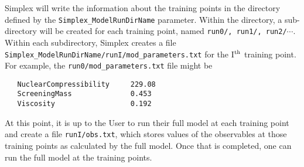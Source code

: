 \documentclass[UserManual.tex]{subfiles}
\begin{document}
Simplex will write the information about the training points in the directory defined by the {\tt Simplex\_ModelRunDirName} parameter. Within the directory, a sub-directory will be created for each training point, named {\tt run0/, run1/, run2/}$\cdots$. Within each subdirectory, Simplex creates a file {\tt Simplex\_ModelRunDirName/runI/mod\_parameters.txt} for the I$^{\rm th}$ training point. For example, the {\tt run0/mod\_parameters.txt} file might be
{\tt\begin{verbatim}
   NuclearCompressibility     229.08
   ScreeningMass              0.453
   Viscosity                  0.192
\end{verbatim}
}
At this point, it is up to the User to run their full model at each training point and create a file {\tt runI/obs.txt}, which stores values of the observables at those training points as calculated by the full model. Once that is completed, one can run the full model at the training points. 
\end{document}
